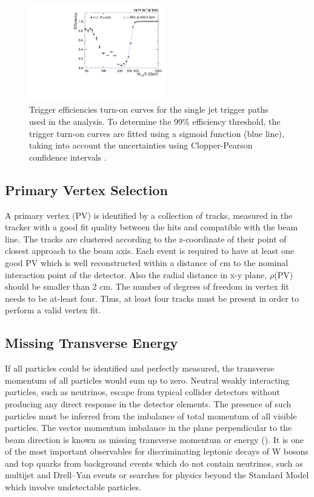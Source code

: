\begin{figure}[!htbp]
\begin{center}
 \includegraphics[width=0.53\textwidth]{Plots_HT_2_150/Fit_Turn_Efficiency_320_2_ht_2.pdf}
 \caption{Trigger efficiencies turn-on curves for the single jet trigger paths used in the analysis. To determine the 99\% efficiency threshold, the trigger turn-on curves are fitted using a sigmoid function (blue line), taking into account the uncertainties using Clopper-Pearson confidence intervals \cite{10.2307/2331986}.}
 \label{fig:trig_eff}
 \end{center}
\end{figure}

\subsection{Primary Vertex Selection}
A primary vertex (PV) is identified by a collection of tracks, measured in the tracker with a good fit quality between the hits and compatible with the beam line. The tracks are clustered according to the z-coordinate of their point of closest approach to the beam axis. Each event is required to have at least one good PV which is well reconstructed within a distance of  cm to the nominal interaction point of the detector. Also the radial distance in x-y plane, $\rho$(PV) should be smaller than 2 cm. The number of degrees of freedom in vertex fit needs to be at-least four. Thus, at least four tracks must be present in order to perform a valid vertex fit.

\subsection{Missing Transverse Energy}
If all particles could be identified and perfectly measured, the transverse momentum of all particles would sum up to zero. Neutral weakly interacting particles, such as neutrinos, escape from typical collider detectors without producing any direct response in the detector elements. The presence of such particles must be inferred from the imbalance of total momentum of all visible particles. The vector momentum imbalance in the plane perpendicular to the beam direction is known as missing transverse momentum or energy (\ETmiss). It is one of the most important observables for discriminating leptonic decays of W bosons and top quarks from background events which do not contain neutrinos, such  as multijet and Drell–Yan events or searches for physics beyond the Standard Model which involve undetectable particles.

